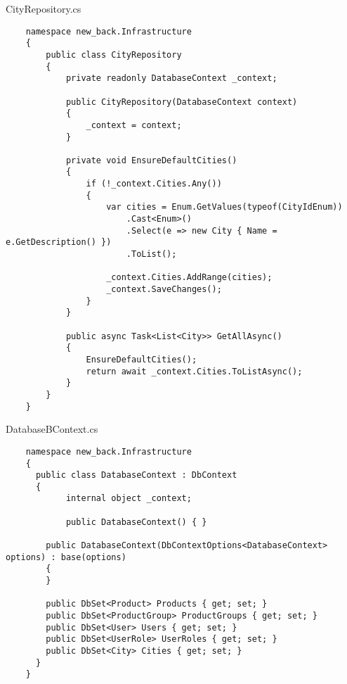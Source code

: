 CityRepository.cs
\lstset{style=sharpc}
\begin{lstlisting}
    namespace new_back.Infrastructure
    {
        public class CityRepository
        {
            private readonly DatabaseContext _context;
    
            public CityRepository(DatabaseContext context)
            {
                _context = context;
            }
    
            private void EnsureDefaultCities()
            {
                if (!_context.Cities.Any())
                {
                    var cities = Enum.GetValues(typeof(CityIdEnum))
                        .Cast<Enum>()
                        .Select(e => new City { Name = e.GetDescription() })
                        .ToList();
    
                    _context.Cities.AddRange(cities);
                    _context.SaveChanges();
                }
            }
    
            public async Task<List<City>> GetAllAsync()
            {
                EnsureDefaultCities();
                return await _context.Cities.ToListAsync();
            }
        }
    }    
\end{lstlisting}

DatabaseBContext.cs
\lstset{style=sharpc}
\begin{lstlisting}
    namespace new_back.Infrastructure
    {  
      public class DatabaseContext : DbContext
      {
            internal object _context;
    
            public DatabaseContext() { }
    
        public DatabaseContext(DbContextOptions<DatabaseContext> options) : base(options)
        {
        }
    
        public DbSet<Product> Products { get; set; }
        public DbSet<ProductGroup> ProductGroups { get; set; }
        public DbSet<User> Users { get; set; }
        public DbSet<UserRole> UserRoles { get; set; }
        public DbSet<City> Cities { get; set; }
      }
    }
\end{lstlisting}

